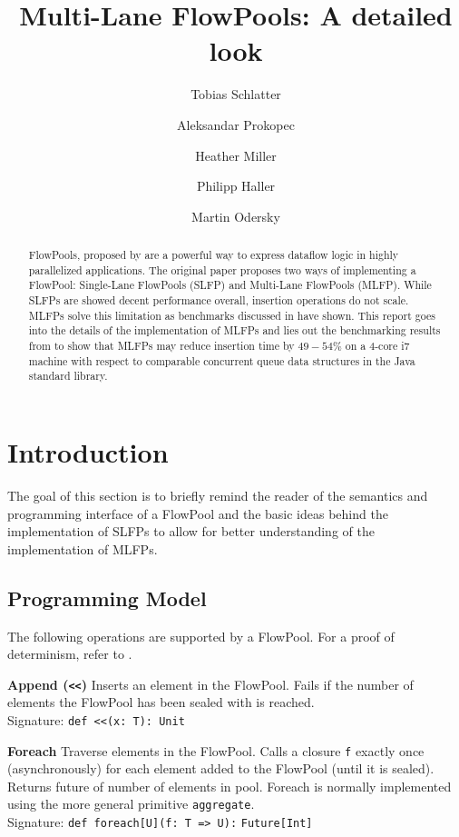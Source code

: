 \documentclass[runningheads,a4paper,fleqn]{llncs}
\begin{document}
\title{Multi-Lane FlowPools: A detailed look}
\author{Tobias Schlatter \and Aleksandar Prokopec \and
  Heather Miller \and Philipp Haller \and Martin
  Odersky}



\maketitle

\begin{abstract}
  FlowPools, proposed by \cite{FP12} are a powerful way to express
  dataflow logic in highly parallelized applications. The original
  paper proposes two ways of implementing a FlowPool: Single-Lane
  FlowPools (SLFP) and Multi-Lane FlowPools (MLFP). While SLFPs are
  showed decent performance overall, insertion operations do not
  scale. MLFPs solve this limitation as benchmarks discussed in
  \cite{FP12} have shown. This report goes into the details of the
  implementation of MLFPs and lies out the benchmarking results from
  \cite{FP12} to show that MLFPs may reduce insertion time by $49 -
  54\%$ on a 4-core i7 machine with respect to comparable concurrent
  queue data structures in the Java standard library.
\end{abstract}

\section{Introduction}
The goal of this section is to briefly remind the reader of the
semantics and programming interface of a FlowPool and the basic ideas
behind the implementation of SLFPs to allow for better understanding
of the implementation of MLFPs.

\subsection{Programming Model}
The following operations are supported by a FlowPool. For a proof of
determinism, refer to \cite{FP12}.

\textbf{Append (\texttt{<<})} Inserts an element in the
FlowPool. Fails if the number of elements the FlowPool has been sealed
with is reached.\\
Signature: \verb+def <<(x: T): Unit+

\textbf{Foreach} Traverse elements in the FlowPool. Calls a closure
\verb+f+ exactly once (asynchronously) for each element added to the
FlowPool (until it is sealed). Returns future of number of elements in
pool. Foreach is normally implemented using the more general primitive
\verb+aggregate+.\\
Signature: \verb+def foreach[U](f: T => U):+ \verb+Future[Int]+
\end{document}
